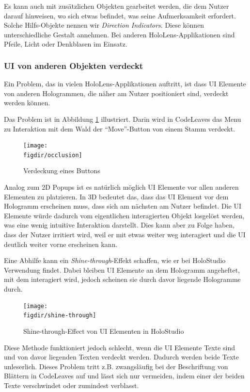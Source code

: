 Es kann auch mit zusätzlichen Objekten gearbeitet werden, die dem Nutzer darauf hinweisen, wo sich etwas befindet, was seine Aufmerksamkeit erfordert. Solche Hilfs-Objekte nennen wir \textit{Direction Indicators}. Diese können unterschiedliche Gestalt annehmen. Bei anderen HoloLens-Applikationen sind Pfeile, Licht oder Denkblasen im Einsatz.

\subsubsection*{UI von anderen Objekten verdeckt}

Ein Problem, das in vielen HoloLens-Applikationen auftritt, ist dass UI Elemente von anderen Hologrammen, die näher am Nutzer positioniert sind, verdeckt werden können.

Das Problem ist in Abbildung \ref{fig:occlusion} illustriert. Darin wird in CodeLeaves das Menu zu Interaktion mit dem Wald der "`Move"'-Button von einem Stamm verdeckt.

\begin{figure}[htb]
  \texttt{[image: \\figdir/occlusion]}
  \caption{Verdeckung eines Buttons}
  \label{fig:occlusion}
\end{figure}

Analog zum 2D Popups ist es natürlich möglich UI Elemente vor allen anderen Elementen zu platzieren. In 3D bedeutet das, dass das UI Element vor dem Hologramm erscheinen muss, dass sich am nächsten am Nutzer befindet. Die UI Elemente würde dadurch vom eigentlichen interagierten Objekt losgelöst werden, was eine wenig intuitive Interaktion darstellt. Dies kann aber zu Folge haben, dass der Nutzer irritiert wird, weil er mit etwas weiter weg interagiert und die UI deutlich weiter vorne erscheinen kann.

Eine Abhilfe kann ein \textit{Shine-through}-Effekt schaffen, wie er bei HoloStudio Verwendung findet. Dabei bleiben UI Elemente an dem Hologramm angeheftet, mit dem interagiert wird, jedoch scheinen sie durch davor liegende Hologramme durch.

\begin{figure}[htb]
  \texttt{[image: \\figdir/shine-through]}
  \caption{Shine-through-Effect von UI Elementen in HoloStudio \cite{windows2017casestudy3}}
  \label{fig:shine-through}
\end{figure}

Diese Methode funktioniert jedoch schlecht, wenn die UI Elemente Texte sind und von davor liegenden Texten verdeckt werden. Dadurch werden beide Texte unleserlich. Dieses Problem tritt z.B. zwangsläufig bei der Beschriftung von Blättern in CodeLeaves auf und lässt sich nur vermeiden, indem einer der beiden Texte verschwindet oder zumindest verblasst.

